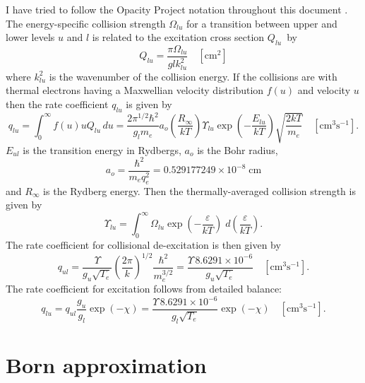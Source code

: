 I have tried to follow the Opacity Project notation throughout this
document \citep{Lanzafame1993}.
The energy-specific collision strength
$\Omega_{lu}$ for a transition between upper and lower levels $u$ and $l$ is related to
the excitation cross section $Q_{lu}$~by
\begin{equation}
{Q_{lu}} = \frac{{\pi {\Omega _{lu}}}}{{glk_{lu}^2}}
\quad [\mathrm{cm}^2]
\end{equation}
where $k_{lu}^2$  is the wavenumber of the collision energy.
If the collisions are with
thermal electrons having a Maxwellian velocity distribution $f(u)$ and velocity
$u$ then the rate coefficient $q_{lu}$ is given by
\begin{equation}
{q_{lu}} = \int_0^\infty  {f\left( u \right)} u{Q_{lu}}\,du = \frac{{2{\pi
^{1/2}}{\hbar ^2}}}{{{g_l}{m_e}}}{a_o}\left( {\frac{{{R_\infty }}}{{kT}}}
\right){\Upsilon _{lu}}\exp \left( { - \frac{{{E_{lu}}}}{{kT}}} \right)\sqrt
{\frac{{2kT}}{{{m_e}}}}\quad
[\mathrm{cm}^3 \mathrm{s}^{-1}].
\end{equation}
$E_{ul}$ is the transition energy in Rydbergs, $a_o$ is the Bohr radius,
\begin{equation}
{a_o} = \frac{{{\hbar ^2}}}{{{m_e}q_e^2}} = 0.529177249 \times {10^{ -
8}}\;{\mathrm{cm}}
\end{equation}
and ${R_\infty }$ is the Rydberg energy.
Then the thermally-averaged collision strength is given by
\begin{equation}
{\Upsilon _{lu}} = \int_0^\infty  {{\Omega _{lu}}\exp \left( { -
\frac{\varepsilon }{{kT}}} \right)\;d\left( {\frac{\varepsilon }{{kT}}}
\right)}.
\end{equation}
The rate coefficient for collisional de-excitation is then given by
\begin{equation}
{q_{ul}} = \frac{\Upsilon }{{{g_u}\sqrt {{T_e}} }}{\left( {\frac{{2\pi
}}{k}} \right)^{1/2}}\frac{{{\hbar ^2}}}{{m_e^{3/2}}} = \frac{{\Upsilon
\,8.6291 \times {{10}^{ - 6}}}}{{{g_u}\sqrt {{T_e}} }}
\quad  [\mathrm{cm}^3 \mathrm{s}^{-1}].
\end{equation}
The rate coefficient for excitation follows from detailed balance:
\begin{equation}
{q_{lu}} = {q_{ul}}\frac{{{g_u}}}{{{g_l}}}\exp \left( { - \chi } \right)
= \frac{{\Upsilon \,8.6291 \times {{10}^{ - 6}}}}{{{g_l}\sqrt {{T_e}} }}\exp
\left( { - \chi } \right)\quad  [\mathrm{cm}^3 \mathrm{s}^{-1}].
\end{equation}

\section{Born approximation }

